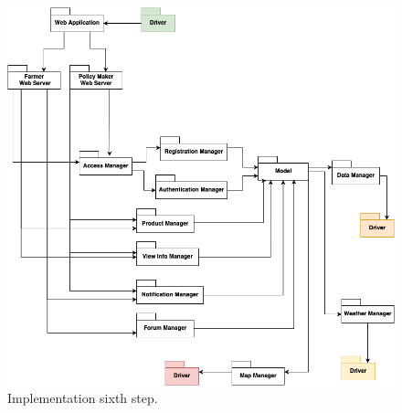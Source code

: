 \begin{enumerate}
\begin{figure}[H]
\begin{center}
        \includegraphics[width=1\textwidth]{implementation/step6.png}
        \caption{Implementation sixth step.}
        \label{fig:sixth step}
        \end{center}
    \end{figure}
\end{enumerate}